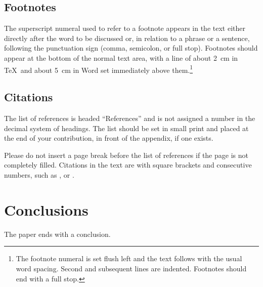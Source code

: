 \documentclass[runningheads]{llncs}
\begin{document}
\subsection{Footnotes}

The superscript numeral used to refer to a footnote appears in the text
either directly after the word to be discussed or, in relation to a
phrase or a sentence, following the punctuation sign (comma,
semicolon, or full stop). Footnotes should appear at the bottom of
the
normal text area, with a line of about 2~cm in \TeX\ and about 5~cm in
Word set
immediately above them.\footnote{The footnote numeral is set flush left
	and the text follows with the usual word spacing. Second and subsequent
	lines are indented. Footnotes should end with a full stop.}

\subsection{Citations}

The list of references is headed ``References'' and is not assigned a
number in the decimal system of headings. The list should be set in small print and placed at the end of your contribution, in front of the appendix, if one exists.

Please do not insert a page break before the list of references if the page is not completely filled. Citations in the text are with square brackets and consecutive numbers, such as \cite{Alpher02}, or \cite{Alpher03,Herman04}.



\section{Conclusions}

The paper ends with a conclusion. 




\end{document}
